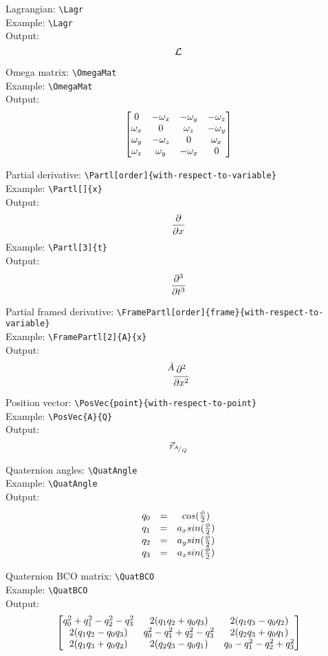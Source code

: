 \documentclass{article}
\begin{document}
\noindent
Lagrangian: \verb|\Lagr|\\
Example: \verb|\Lagr|\\
Output:
\begin{equation*}
    \Lagr
\end{equation*}  

\noindent
Omega matrix: \verb|\OmegaMat|\\
Example: \verb|\OmegaMat|\\
Output:
\begin{equation*}
    \OmegaMat
\end{equation*} 

\noindent
Partial derivative: \verb|\Partl[order]{with-respect-to-variable}|\\
Example: \verb|\Partl[]{x}|\\
Output:
\begin{equation*}
    \Partl[]{x}
\end{equation*} 
Example: \verb|\Partl[3]{t}|\\
Output:
\begin{equation*}
    \Partl[3]{t}
\end{equation*} 

\noindent
Partial framed derivative: \verb|\FramePartl[order]{frame}{with-respect-to-variable}|\\
Example: \verb|\FramePartl[2]{A}{x}|\\
Output:
\begin{equation*}
    \FramePartl[2]{A}{x}
\end{equation*} 

\noindent
Position vector: \verb|\PosVec{point}{with-respect-to-point}|\\
Example: \verb|\PosVec{A}{Q}|\\
Output:
\begin{equation*}
    \PosVec{A}{Q}
\end{equation*} 

\noindent
Quaternion angles: \verb|\QuatAngle|\\
Example: \verb|\QuatAngle|\\
Output:
\begin{equation*}
    \QuatAngle
\end{equation*} 

\noindent
Quaternion BCO matrix: \verb|\QuatBCO|\\
Example: \verb|\QuatBCO|\\
Output:
\begin{equation*}
    \QuatBCO
\end{equation*} 
\end{document}
